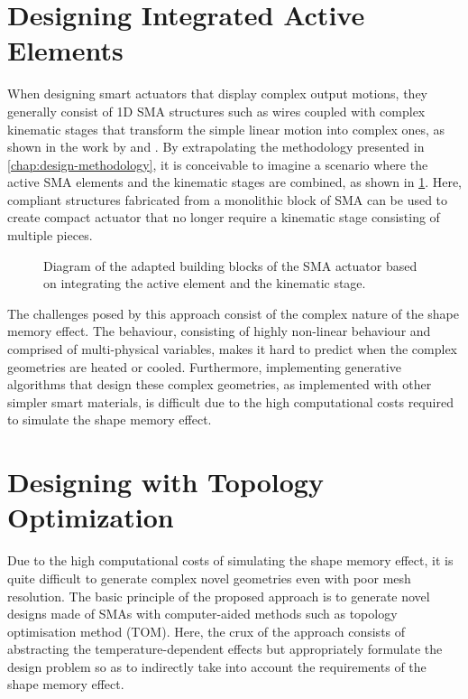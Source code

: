 \section{Designing Integrated Active Elements}
When designing smart actuators that display complex output motions, they generally consist of 1D SMA structures such as wires coupled with complex kinematic stages that transform the simple linear motion into complex ones, as shown in the work by \todocite and \todocite. By extrapolating the methodology presented in \cref{chap:design-methodology}, it is conceivable to imagine a scenario where the active SMA elements and the kinematic stages are combined, as shown in \cref{fig:building-blocks-at}. Here, compliant structures fabricated from a monolithic block of SMA can be used to create compact actuator that no longer require a kinematic stage consisting of multiple pieces.

\begin{figure}[hbt!] %
  \centering
  
  \caption{Diagram of the adapted building blocks of the SMA actuator based on integrating the active element and the kinematic stage.}
  \label{fig:building-blocks-at}
\end{figure}

The challenges posed by this approach consist of the complex nature of the shape memory effect. The behaviour, consisting of highly non-linear behaviour and comprised of multi-physical variables, makes it hard to predict when the complex geometries are heated or cooled. Furthermore, implementing generative algorithms that design these complex geometries, as implemented with other simpler smart materials, is difficult due to the high computational costs required to simulate the shape memory effect.

\section{Designing with Topology Optimization}
Due to the high computational costs of simulating the shape memory effect, it is quite difficult to generate complex novel geometries even with poor mesh resolution. The basic principle of the proposed approach is to generate novel designs made of SMAs with computer-aided methods such as topology optimisation method (TOM). Here, the crux of the approach consists of abstracting the temperature-dependent effects but appropriately formulate the design problem so as to indirectly take into account the requirements of the shape memory effect.


